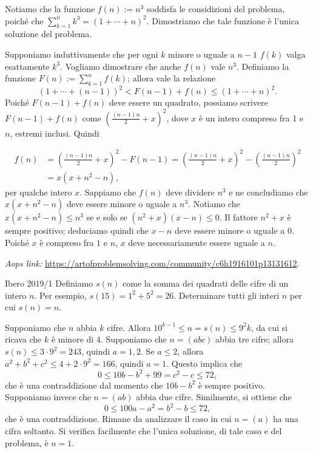 \documentclass{article}
\begin{document}
Notiamo che la funzione $f(n):=n^3$ soddisfa le considizioni
del problema, poiché che $\sum_{k=1}^n k^3=(1+\cdots+n)^2$.
Dimostriamo che tale funzione è l'unica soluzione del problema.

Supponiamo induttivamente che per ogni $k$ minore o uguale a $n-1$
$f(k)$ valga esattamente $k^3$. Vogliamo dimostrare che
anche $f(n)$ vale $n^3$. Definiamo la funzione $F(n):=\sum_{k=1}^n f(k)$;
allora vale la relazione
\begin{equation*}
	(1+\cdots+(n-1))^2<F(n-1)+f(n)\le (1+\cdots+n)^2.
\end{equation*}
Poiché $F(n-1)+f(n)$ deve essere un quadrato,
possiamo scrivere $F(n-1)+f(n)$ come $\left(\frac{(n-1)n}{2}+x\right)^2$, dove
$x$ è un intero compreso fra 1 e $n$, estremi inclusi. Quindi

\begin{align*}
	f(n) &=\left( \frac{(n-1)n}{2}+x \right) ^2-F(n-1)
	=\left( \frac{(n-1)n}{2}+x \right)^2 - \left( \frac{(n-1)n}{2} \right)^2 \\
		  &= x(x+n^2-n),
\end{align*}
per qualche intero $x$. Sappiamo che $f(n)$ deve dividere $n^3$ e ne concludiamo
che $x(x+n^2-n)$ deve essere minore o uguale a $n^3$. Notiamo che
$x(x+n^2-n)\le n^3$ se e solo se $(n^2+x)(x-n)\le 0$. Il fattore $n^2+x$ è
sempre positivo; deduciamo quindi che $x-n$ deve essere minore o uguale a 0.
Poiché $x$ è compreso fra $1$ e $n$, $x$ deve necessariamente essere uguale a $n$.


\vspace{0.5cm}
\textit{Aops link:}
\href{https://artofproblemsolving.com/community/c6h1916101p13131612}
{https://artofproblemsolving.com/community/c6h1916101p13131612}.

\begin{proposition}{Ibero 2019/1}{}
	Definiamo $s(n)$ come la somma dei quadrati delle cifre di un intero $n$.
	Per esempio, $s(15)=1^2+5^2=26$. Determinare tutti gli interi $n$ per cui
	$s(n)=n$.
\end{proposition}

Supponiamo che $n$ abbia $k$ cifre. Allora $10^{k-1}\le n=s(n) \le 9^2k$,
da cui si ricava che $k$ è minore di 4.
Supponiamo che $n=(abc)$ abbia tre cifre;
allora $s(n)\le 3\cdot 9^2=243$, quindi $a=1,2$. Se $a\le 2$, allora
$a^2+b^2+c^2\le 4+2\cdot 9^2=166$, quindi $a=1$. Questo implica che
\begin{equation*}
	0\le 10b-b^2+99=c^2-c \le 72,
\end{equation*}
che è una contraddizione dal momento che $10b-b^2$ è sempre positivo.
Supponiamo invece che $n=(ab)$ abbia due cifre. Similmente, si ottiene che
\begin{equation*}
	0\le 100a-a^2=b^2-b \le 72,
\end{equation*}
che è una contraddizione. Rimane da analizzare il caso in cui $n=(a)$ ha
una cifra soltanto. Si verifica facilmente che l'unica soluzione, di tale caso
e del problema, è $n=1$.
\end{document}
